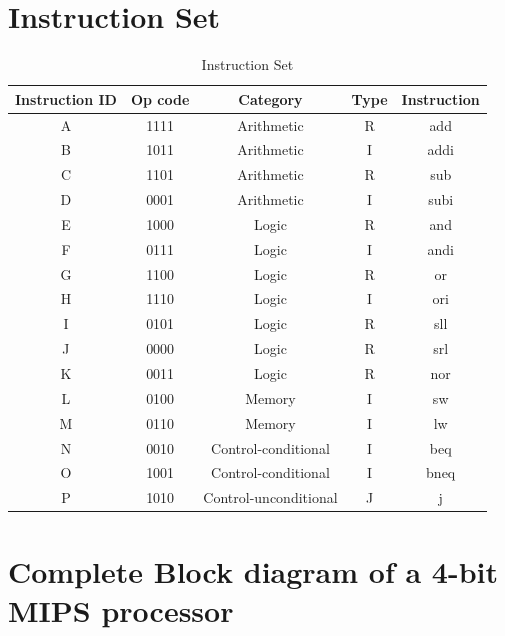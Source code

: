 \documentclass{article}
\begin{document}
		\section{Instruction Set}
		\begin{table}[h]
			\centering
			\begin{tabular}{|c|c|c|c|c|}
				\hline
				Instruction ID & Op code & Category & Type & Instruction\\
				\hline
				A & 1111 & Arithmetic & R & add\\
				\hline
				B & 1011 & Arithmetic & I & addi\\
				\hline
				C & 1101 & Arithmetic & R & sub\\
				\hline
				D & 0001 & Arithmetic & I & subi\\
				\hline
				E & 1000 & Logic & R & and\\
				\hline
				F & 0111 & Logic & I & andi\\
				\hline
				G & 1100 & Logic & R & or\\
				\hline
				H & 1110 & Logic & I & ori\\
				\hline
				I & 0101 & Logic & R & sll\\
				\hline
				J & 0000 & Logic & R & srl\\
				\hline
				K & 0011 & Logic & R & nor\\
				\hline
				L & 0100 & Memory & I & sw\\
				\hline
				M & 0110 & Memory & I & lw\\
				\hline
				N & 0010 & Control-conditional & I & beq\\
				\hline
				O & 1001 & Control-conditional & I & bneq\\
				\hline
				P & 1010 & Control-unconditional & J & j\\
				\hline
			\end{tabular}
			\caption{Instruction Set}
			\label{tab:table1}
		\end{table}
		
		
		
		
		\newpage
		
		
		
		
		\section{Complete Block diagram of a 4-bit MIPS processor}
		
\end{document}
